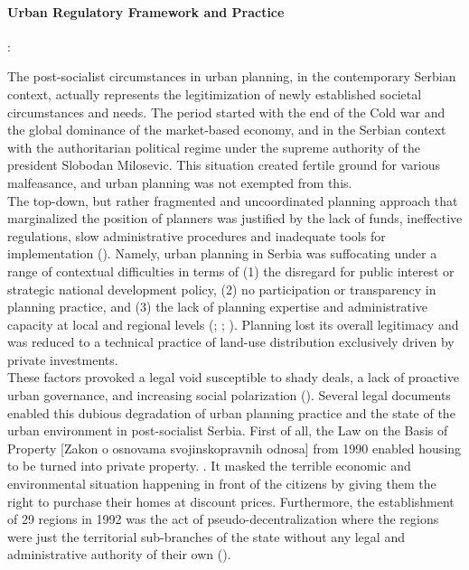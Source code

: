 \documentclass[11pt]{report}
\begin{document}
{{{{\paragraph{Urban Regulatory Framework and Practice}:

The post-socialist circumstances in urban planning, in the contemporary Serbian context, actually represents the legitimization of newly established societal circumstances and needs. The period started with the end of the Cold war and the global dominance of the market-based economy, and in the Serbian context with the authoritarian political regime under the supreme authority of the president Slobodan Milosevic. This situation created fertile ground for various malfeasance, and urban planning was not exempted from this.
\\

The top-down, but rather fragmented and uncoordinated planning approach that marginalized the position of planners was justified by the lack of funds, ineffective regulations, slow administrative procedures and inadequate tools for implementation
(\href{Peric}{\citealt{peric_evolution_2016}}). 
Namely, urban planning in Serbia was suffocating under a range of contextual difficulties in terms of (1) the disregard for public interest or strategic national development policy, (2) no participation or transparency in planning practice, and (3) the lack of planning expertise and administrative capacity at local and regional levels (\href{Stojkov}{\citealt{stojkov_neue_1998}}; \href{Vujosevic}{\citealt{vujosevic_planiranje_2003}}; \href{Vujosevic}{ \citealt{vujosevic_planning_2006}}).
Planning lost its overall legitimacy and was reduced to a technical practice of land-use distribution exclusively driven by private investments. 
\\

These factors provoked a legal void susceptible to shady deals, a lack of proactive urban governance, and increasing social polarization (\href{Tsenkova}{\citealt{tsenkova_beyond_2006}}). 
Several legal documents enabled this dubious degradation of urban planning practice and the state of the urban environment in post-socialist Serbia.
First of all, the Law on the Basis of Property [Zakon o osnovama svojinskopravnih odnosa] from 1990 enabled housing to be turned into private property. . It masked the terrible economic and environmental situation happening in front of the citizens by giving them the right to purchase their homes at discount prices. Furthermore, the establishment of 29 regions in 1992 was the act of pseudo-decentralization where the regions were just the territorial sub-branches of the state without any legal and administrative authority of their own (\href{Vujosevic}{\citealt{vujosevic_regionalizam_2015}}).
\\

}}}}
\end{document}
